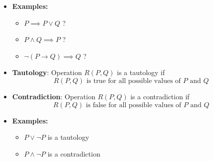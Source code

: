 \documentclass[11pt,twoside]{report}
\begin{document}
\begin{itemize}
\item \textbf{Examples:} %
\begin{itemize}
\item $P \implies P \vee Q$ ?
\item $P \wedge Q \implies P$ ?
\item $\neg (P \to Q )  \implies  Q$ ?
\end{itemize}







\item \textbf{Tautology}:  Operation  $R(P, Q)$ is a tautology if 
\[
 \text{$R(P, Q)$ is true for all possible values of $P$ and $Q$}
\]


\item \textbf{Contradiction}:  Operation  $R(P, Q)$ is a contradiction  if 
\[
 \text{$R(P, Q)$ is false for all possible values of $P$ and $Q$}
\]

\item \textbf{Examples:} 
\begin{itemize}
\item $P \vee \neg P$ is a  tautology
\item $P \wedge \neg P$ is a contradiction 
\end{itemize}




  \end{itemize}
  
\end{document}
